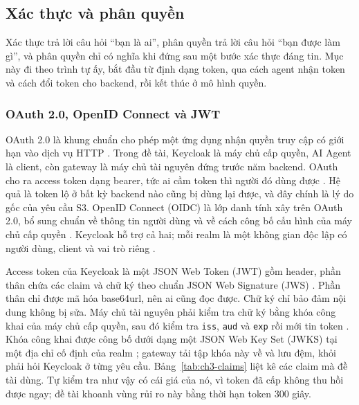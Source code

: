 \documentclass[a4paper]{article}
\begin{document}
\subsection{Xác thực và phân quyền}

Xác thực trả lời câu hỏi ``bạn là ai'', phân quyền trả lời câu hỏi ``bạn được làm gì'', và phân quyền chỉ có nghĩa khi đứng sau một bước xác thực đáng tin. Mục này đi theo trình tự ấy, bắt đầu từ định dạng token, qua cách agent nhận token và cách đổi token cho backend, rồi kết thúc ở mô hình quyền.

\subsubsection{OAuth 2.0, OpenID Connect và JWT}

OAuth 2.0 là khung chuẩn cho phép một ứng dụng nhận quyền truy cập có giới hạn vào dịch vụ HTTP \parencite{rfc6749}. Trong đề tài, Keycloak là máy chủ cấp quyền, AI Agent là client, còn gateway là máy chủ tài nguyên đứng trước năm backend. OAuth cho ra access token dạng bearer, tức ai cầm token thì người đó dùng được \parencite{rfc6750}. Hệ quả là token lộ ở bất kỳ backend nào cũng bị dùng lại được, và đây chính là lý do gốc của yêu cầu S3. OpenID Connect (OIDC) là lớp danh tính xây trên OAuth 2.0, bổ sung chuẩn về thông tin người dùng và về cách công bố cấu hình của máy chủ cấp quyền \parencite{oidc_core}. Keycloak hỗ trợ cả hai; mỗi realm là một không gian độc lập có người dùng, client và vai trò riêng \parencite{keycloak}.

Access token của Keycloak là một JSON Web Token (JWT) gồm header, phần thân chứa các claim và chữ ký theo chuẩn JSON Web Signature (JWS) \parencite{rfc7519,rfc7515}. Phần thân chỉ được mã hóa base64url, nên ai cũng đọc được. Chữ ký chỉ bảo đảm nội dung không bị sửa. Máy chủ tài nguyên phải kiểm tra chữ ký bằng khóa công khai của máy chủ cấp quyền, sau đó kiểm tra \texttt{iss}, \texttt{aud} và \texttt{exp} rồi mới tin token \parencite{rfc9068}. Khóa công khai được công bố dưới dạng một JSON Web Key Set (JWKS) tại một địa chỉ cố định của realm \parencite{rfc7517}; gateway tải tập khóa này về và lưu đệm, khỏi phải hỏi Keycloak ở từng yêu cầu. Bảng~\ref{tab:ch3-claims} liệt kê các claim mà đề tài dùng. Tự kiểm tra như vậy có cái giá của nó, vì token đã cấp không thu hồi được ngay; đề tài khoanh vùng rủi ro này bằng thời hạn token 300 giây.
\end{document}
